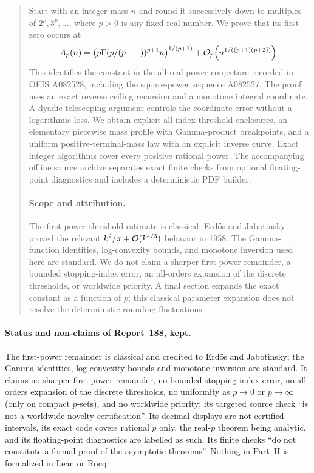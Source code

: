 \begin{quote}\small
Start with an integer mass $n$ and round it successively down to multiples of $2^p,3^p,\ldots$, where $p>0$ is any fixed real number. We prove that its first zero occurs at
\[
 A_p(n)=\bigl(p\Gamma(p/(p+1))^{p+1}n\bigr)^{1/(p+1)}
       +\mathcal O_p\!\left(n^{1/((p+1)(p+2))}\right).
\]
This identifies the constant in the all-real-power conjecture recorded in OEIS A082528, including the square-power sequence A082527. The proof uses an exact reverse ceiling recursion and a monotone integral coordinate. A dyadic telescoping argument controls the coordinate error without a logarithmic loss. We obtain explicit all-index threshold enclosures, an elementary piecewise mass profile with Gamma-product breakpoints, and a uniform positive-terminal-mass law with an explicit inverse curve. Exact integer algorithms cover every positive rational power. The accompanying offline source archive separates exact finite checks from optional floating-point diagnostics and includes a deterministic PDF builder.

\paragraph{Scope and attribution.}
The first-power threshold estimate is classical: Erd\H{o}s and Jabotinsky proved the relevant $k^2/\pi+\mathcal O(k^{4/3})$ behavior in 1958. The Gamma-function identities, log-convexity bounds, and monotone inversion used here are standard. We do not claim a sharper first-power remainder, a bounded stopping-index error, an all-orders expansion of the discrete thresholds, or worldwide priority. A final section expands the exact constant as a function of $p$; this classical parameter expansion does not resolve the deterministic rounding fluctuations.
\end{quote}

\paragraph{Status and non-claims of Report~188, kept.} The first-power
remainder is classical and credited to Erd\H{o}s and Jabotinsky; the Gamma
identities, log-convexity bounds and monotone inversion are standard. It
claims no sharper first-power remainder, no bounded stopping-index error, no
all-orders expansion of the discrete thresholds, no uniformity as
$p\to0$ or $p\to\infty$ (only on compact $p$-sets), and no worldwide
priority; its targeted source check ``is not a worldwide novelty
certification''. Its decimal displays are not certified intervals, its
exact code covers rational $p$ only, the real-$p$ theorem being analytic,
and its floating-point diagnostics are labelled as such. Its finite checks
``do not constitute a formal proof of the asymptotic theorems''. Nothing in
Part~II is formalized in Lean or Rocq.


